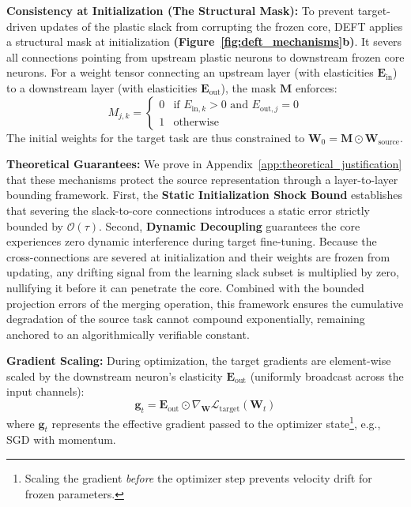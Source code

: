\documentclass[11pt, a4paper, copyright, gdm]{google}
\newcommand{\gVect}{\boldsymbol{g}}
\newcommand{\calL}{\mathcal{L}}
\newcommand{\calO}{\mathcal{O}}
\newcommand{\Emat}{\boldsymbol{E}}
\newcommand{\Mmat}{\boldsymbol{M}}
\newcommand{\Wmat}{\boldsymbol{W}}
\theoremstyle{definition}
\begin{document}
\textbf{Consistency at Initialization (The Structural Mask):} To prevent target-driven updates of the plastic slack from corrupting the frozen core, DEFT applies a structural mask at initialization \textbf{(Figure~\ref{fig:deft_mechanisms}b)}. It severs all connections pointing from upstream plastic neurons to downstream frozen core neurons. For a weight tensor connecting an upstream layer (with elasticities $\Emat_{\text{in}}$) to a downstream layer (with elasticities $\Emat_{\text{out}}$), the mask $\Mmat$ enforces:
\begin{equation}
    M_{j,k} = 
    \begin{cases} 
        0 & \text{if } E_{\text{in}, k} > 0 \text{ and } E_{\text{out}, j} = 0 \\
        1 & \text{otherwise}
    \end{cases}
\end{equation}
The initial weights for the target task are thus constrained to $\Wmat_0 = \Mmat \odot \Wmat_{\text{source}}$. 

\textbf{Theoretical Guarantees:} We prove in Appendix~\ref{app:theoretical_justification} that these mechanisms protect the source representation through a layer-to-layer bounding framework. First, the \textbf{Static Initialization Shock Bound} establishes that severing the slack-to-core connections introduces a static error strictly bounded by $\calO(\tau)$. Second, \textbf{Dynamic Decoupling} guarantees the core experiences zero dynamic interference during target fine-tuning. Because the cross-connections are severed at initialization and their weights are frozen from updating, any drifting signal from the learning slack subset is multiplied by zero, nullifying it before it can penetrate the core. Combined with the bounded projection errors of the merging operation, this framework ensures the cumulative degradation of the source task cannot compound exponentially, remaining anchored to an algorithmically verifiable constant.

\textbf{Gradient Scaling:} During optimization, the target gradients are element-wise scaled by the downstream neuron's elasticity $\Emat_{\text{out}}$ (uniformly broadcast across the input channels):
\begin{equation}
    \gVect_t = \Emat_{\text{out}} \odot \nabla_{\Wmat} \calL_{\text{target}}(\Wmat_t)
\end{equation}
where $\gVect_t$ represents the effective gradient passed to the optimizer state\footnote{ Scaling the gradient \textit{before} the optimizer step prevents velocity drift for frozen parameters.}, e.g., SGD with momentum.
\end{document}
